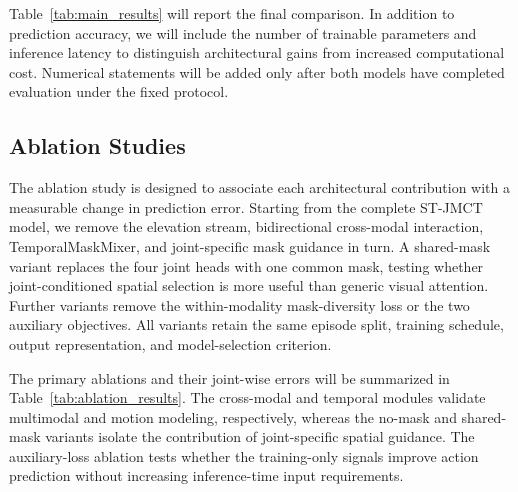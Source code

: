 \documentclass[journal]{IEEEtran}
\begin{document}
Table~\ref{tab:main_results} will report the final comparison. In addition to
prediction accuracy, we will include the number of trainable parameters and
inference latency to distinguish architectural gains from increased
computational cost. Numerical statements will be added only after both models
have completed evaluation under the fixed protocol.

\begin{table}[!t]
\caption{Comparison with the Standard Transformer under the Same Data Split
and Training Protocol. Lower MAE and latency are better; higher $R^2$ is
better.}
\label{tab:main_results}
\centering
{}
\end{table}

\subsection{Ablation Studies}
\label{subsec:ablation}

The ablation study is designed to associate each architectural contribution
with a measurable change in prediction error. Starting from the complete
ST-JMCT model, we remove the elevation stream, bidirectional cross-modal
interaction, TemporalMaskMixer, and joint-specific mask guidance in turn. A
shared-mask variant replaces the four joint heads with one common mask, testing
whether joint-conditioned spatial selection is more useful than generic visual
attention. Further variants remove the within-modality mask-diversity loss or
the two auxiliary objectives. All variants retain the same episode split,
training schedule, output representation, and model-selection criterion.

The primary ablations and their joint-wise errors will be summarized in
Table~\ref{tab:ablation_results}. The cross-modal and temporal modules validate
multimodal and motion modeling, respectively, whereas the no-mask and
shared-mask variants isolate the contribution of joint-specific spatial
guidance. The auxiliary-loss ablation tests whether the training-only signals
improve action prediction without increasing inference-time input
requirements.
\end{document}
